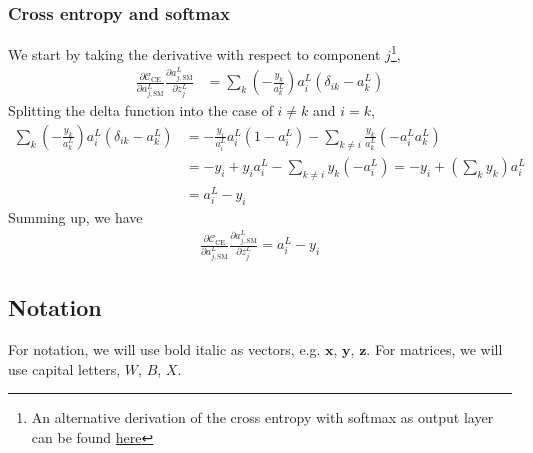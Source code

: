 \documentclass[a4paper,10pt]{article}
\newcommand{\pd}[2]{\frac{\partial {#1}}{\partial {#2}}}
\begin{document}
\subsubsection{Cross entropy and softmax}
We start by taking the derivative with respect to component $j$\footnote{An alternative derivation of the cross entropy with softmax as output layer can be found \href{https://math.stackexchange.com/questions/945871/derivative-of-softmax-loss-function}{here}},
\begin{align*}
    \pd{\mathcal{C}_\mathrm{CE}}{a^L_{j,\mathrm{SM}}} \pd{a^L_{j,\mathrm{SM}}}{z^L_j} &= \sum_k \left( -\frac{y_k}{a^L_k} \right)a_i^L \left( \delta_{ik} - a_k^L \right)
\end{align*}
Splitting the delta function into the case of $i\neq k$ and $i=k$,
\begin{align*}
    \sum_k \left( -\frac{y_k}{a^L_k} \right)a_i^L \left( \delta_{ik} - a_k^L \right) &= -\frac{y_i}{a_i^L}a^L_i \left( 1 - a_i^L \right) - \sum_{k\neq i} \frac{y_k}{a^L_k} \left( -a_i^L a_k^L \right) \\
    &= -y_i + y_i a^L_i - \sum_{k\neq i} y_k (-a_i^L) = -y_i + \left(\sum_k y_k \right) a^L_i \\
    &= a_i^L - y_i
\end{align*}
Summing up, we have
\begin{align}
    \pd{\mathcal{C}_\mathrm{CE}}{a^L_{j,\mathrm{SM}}} \pd{a^L_{j,\mathrm{SM}}}{z^L_j} = a_i^L - y_i
    \label{eq:cross-entropy-softmax-derivative}
\end{align}

\begin{appendices}
\section{Notation} \label{app:notation}
For notation, we will use bold italic as vectors, e.g. $\bm{x}$, $\bm{y}$, $\bm{z}$. For matrices, we will use capital letters, $W$, $B$, $X$.
\end{appendices}
\end{document}
